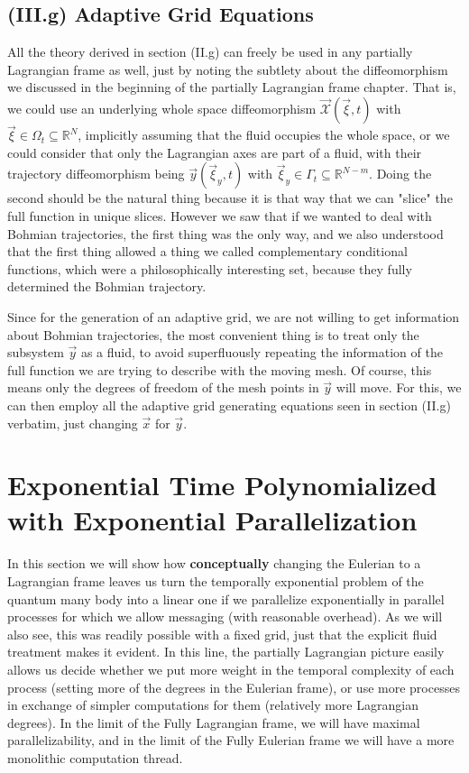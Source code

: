 \documentclass[11pt, a4paper]{article} %
\newcommand{\R}{\mathbb{R}} %
\newcommand{\x}{\mathcal{X}}
\begin{document}
\subsection*{(III.g) Adaptive Grid Equations}
All the theory derived in section (II.g) can freely be used in any partially Lagrangian frame as well, just by noting the subtlety about the diffeomorphism we discussed in the beginning of the partially Lagrangian frame chapter. That is, we could use an underlying whole space diffeomorphism $\vec{\x}(\vec{\xi},t)$ with $\vec{\xi}\in\Omega_t\subseteq\R^N$, implicitly assuming that the fluid occupies the whole space, or we could consider that only the Lagrangian axes are part of a fluid, with their trajectory diffeomorphism being $\vec{y}(\vec{\xi}_y,t)$ with $\vec{\xi}_y\in\Gamma_t\subseteq\R^{N-m}$. Doing the second should be the natural thing because it is that way that we can "slice" the full function in unique slices. However we saw that if we wanted to deal with Bohmian trajectories, the first thing was the only way, and we also understood that the first thing allowed a thing we called complementary conditional functions, which were a philosophically interesting set, because they fully determined the Bohmian trajectory.

Since for the generation of an adaptive grid, we are not willing to get information about Bohmian trajectories, the most convenient thing is to treat only the subsystem $\vec{y}$ as a fluid, to avoid superfluously repeating the information of the full function we are trying to describe with the moving mesh. Of course, this means only the degrees of freedom of the mesh points in $\vec{y}$ will move. For this, we can then employ all the adaptive grid generating equations seen in section (II.g) verbatim, just changing $\vec{x}$ for $\vec{y}$.



\section*{Exponential Time Polynomialized with Exponential Parallelization}

In this section we will show how {\bf conceptually} changing the Eulerian to a Lagrangian frame leaves us turn the temporally exponential problem of the quantum many body into a linear one if we parallelize exponentially in parallel processes for which we allow messaging (with reasonable overhead). As we will also see, this was readily possible with a fixed grid, just that the explicit fluid treatment makes it evident. In this line, the partially Lagrangian picture easily allows us decide whether we put more weight in the temporal complexity of each process (setting more of the degrees in the Eulerian frame), or use more processes in exchange of simpler computations for them (relatively more Lagrangian degrees). In the limit of the Fully Lagrangian frame, we will have maximal parallelizability, and in the limit of the Fully Eulerian frame we will have a more monolithic computation thread.
\end{document}
